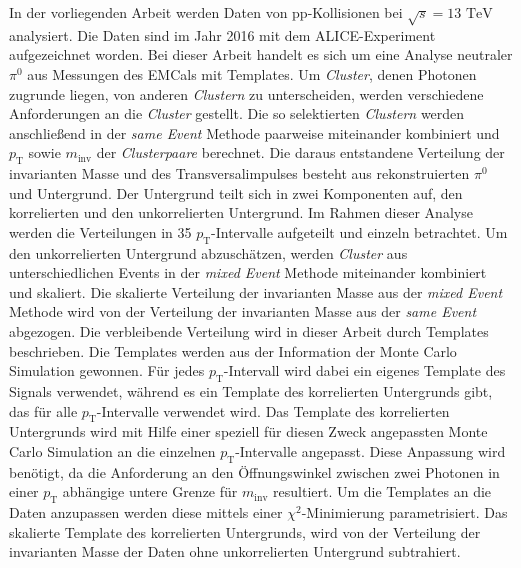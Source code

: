 In der vorliegenden Arbeit werden Daten von pp-Kollisionen bei $\sqrt{s}=13\text{ TeV}$ analysiert.
Die Daten sind im Jahr 2016 mit dem ALICE-Experiment aufgezeichnet worden.
Bei dieser Arbeit handelt es sich um eine Analyse neutraler $\pi^{0}$ aus Messungen des EMCals mit Templates. %
\newline
Um \textit{Cluster}, denen Photonen zugrunde liegen, von anderen \textit{Clustern} zu unterscheiden, werden verschiedene Anforderungen an die \textit{Cluster} gestellt.
Die so selektierten \textit{Clustern} werden anschließend in der \textit{same Event} Methode paarweise miteinander kombiniert und $p_\text{T}$ sowie $m_\text{inv}$ der \textit{Clusterpaare} berechnet.
\newline
Die daraus entstandene Verteilung der invarianten Masse und des Transversalimpulses besteht aus rekonstruierten $\pi^{0}$ und Untergrund.
Der Untergrund teilt sich in zwei Komponenten auf, den kor\-re\-lier\-ten und den unkorrelierten Untergrund.
Im Rahmen dieser Analyse werden die Verteilungen in 35 $p_\text{T}$-Intervalle aufgeteilt und einzeln betrachtet.
\newline
Um den unkorrelierten Untergrund abzuschätzen, werden \textit{Cluster} aus unterschiedlichen Events in der \textit{mixed Event} Methode miteinander kombiniert und skaliert.
Die skalierte Verteilung der invarianten Masse aus der \textit{mixed Event} Methode wird von der Verteilung der invarianten Masse aus der \textit{same Event} abgezogen.
\newline
Die verbleibende Verteilung wird in dieser Arbeit durch Templates beschrieben.
Die Templates werden aus der Information der Monte Carlo Simulation gewonnen.
Für jedes $p_\text{T}$-Intervall wird dabei ein eigenes Template des Signals verwendet, während es ein Template des korrelierten Untergrunds gibt, das für alle $p_\text{T}$-Intervalle verwendet wird.
Das Template des korrelierten Untergrunds wird mit Hilfe einer speziell für diesen Zweck angepassten Monte Carlo Simulation an die einzelnen $p_\text{T}$-Intervalle angepasst.
Diese Anpassung wird benötigt, da die Anforderung an den Öffnungswinkel zwischen zwei Photonen in einer $p_\text{T}$ abhängige untere Grenze für $m_\text{inv}$ resultiert.
\newline
Um die Templates an die Daten anzupassen werden diese mittels einer $\chi^{2}$-Minimierung parametrisiert.
Das skalierte Template des korrelierten Untergrunds, wird von der Verteilung der invarianten Masse der Daten ohne unkorrelierten Untergrund subtrahiert.
